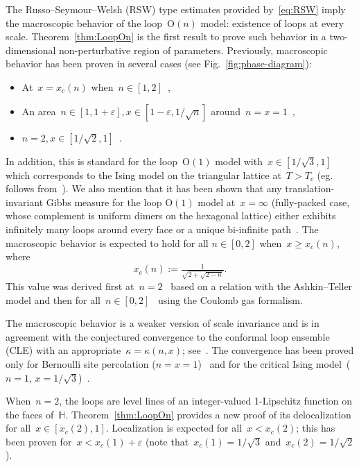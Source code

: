 \documentclass[11pt,letterpaper]{amsart}
\newcounter{n}
\numberwithin{n}{section}
\theoremstyle{plain}
\theoremstyle{definition}
\theoremstyle{remark}
\renewcommand\O[1]{\(\mathrm{O}(#1)\)}
\renewcommand\H{\mathbb H}
\newcommand{\1}{\mathbbm{1}}
\begin{document}
The Russo--Seymour--Welsh (RSW) type estimates provided by~\eqref{eq:RSW} imply the macroscopic behavior of the loop~\O{n} model: existence of loops at every scale.
Theorem~\ref{thm:LoopOn} is the first result to prove such behavior in a two-dimensional non-perturbative region of parameters. 
Previously, macroscopic behavior has been proven in several cases (see Fig.~\ref{fig:phase-diagram}):
\begin{itemize}
	\item At~$x=x_c(n)$ when~$n\in [1,2]$~\cite{DumGlaPel21},
	\item An area~$n\in [1, 1+\varepsilon], x\in [1-\varepsilon,1/\sqrt{n}]$ around~$n=x=1$~\cite{CraGlaHarPel25},
	\item $n=2, x\in [1/\sqrt{2}, 1]$~\cite{GlaMan21,GlaLam25}.
\end{itemize}
In addition, this is standard for the loop~\O{1} model with~$x\in [1/\sqrt{3},1]$ which corresponds to the Ising model on the triangular lattice at~$T>T_c$ (eg. follows from~\cite{Tas16}). 
We also mention that it has been shown that any translation-invariant Gibbs measure for the loop \O{1} model at~$x=\infty$ (fully-packed case, whose complement is uniform dimers on the hexagonal lattice) either exhibits infinitely many loops around every face or a unique bi-infinite path~\cite{GlaRey24}.
The macroscopic behavior is expected to hold for all $n\in[0,2]$ when~$x\geq x_c(n)$, where
\[
	x_c(n):=\tfrac{1}{\sqrt{2+\sqrt{2-n}}}.
\]
This value was derived first at~$n=2$~\cite{DomMukNie81,Fan72} based on a relation with the Ashkin--Teller model and then for all~$n\in [0,2]$~\cite{Nie82} using the Coulomb gas formalism.

The macroscopic behavior is a weaker version of scale invariance and is in agreement with the conjectured convergence to the conformal loop ensemble (CLE) with an appropriate~$\kappa = \kappa (n,x)$; see~\cite[Section~5.6]{KagNie04}.
The convergence has been proved only for Bernoulli site percolation ($n=x=1$)~\cite{Smi01,Smi01a,CamNew06,KhrSmi21}
and for the critical Ising model~($n=1,\, x=1/{\sqrt{3}}$)~\cite{Smi10,CheSmi11,CheDumHonKemSmi14}.

 When~$n=2$, the loops are level lines of an integer-valued 1-Lipschitz function on the faces of~$\H$.
Theorem~\ref{thm:LoopOn} provides a new proof of its delocalization for all~$x\in [x_c(2),1]$.
Localization is expected for all~$x< x_c(2)$; this has been proven for~$x< x_c(1) + \varepsilon$ (note that~$x_c(1)=1/\sqrt{3}$ and~$x_c(2)=1/\sqrt{2}$).
\end{document}
